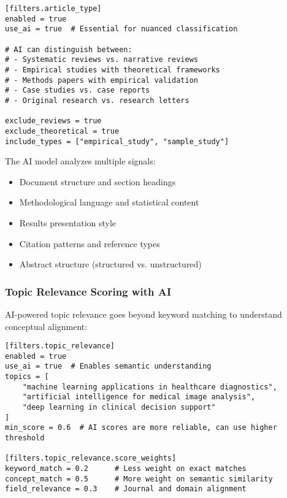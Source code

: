 \begin{configbox}
\begin{lstlisting}
[filters.article_type]
enabled = true
use_ai = true  # Essential for nuanced classification

# AI can distinguish between:
# - Systematic reviews vs. narrative reviews
# - Empirical studies with theoretical frameworks
# - Methods papers with empirical validation
# - Case studies vs. case reports
# - Original research vs. research letters

exclude_reviews = true
exclude_theoretical = true
include_types = ["empirical_study", "sample_study"]
\end{lstlisting}
\end{configbox}

The AI model analyzes multiple signals:
\begin{itemize}
    \item Document structure and section headings
    \item Methodological language and statistical content
    \item Results presentation style
    \item Citation patterns and reference types
    \item Abstract structure (structured vs. unstructured)
\end{itemize}

\subsubsection{Topic Relevance Scoring with AI}

AI-powered topic relevance goes beyond keyword matching to understand conceptual alignment:

\begin{configbox}
\begin{lstlisting}
[filters.topic_relevance]
enabled = true
use_ai = true  # Enables semantic understanding
topics = [
    "machine learning applications in healthcare diagnostics",
    "artificial intelligence for medical image analysis",
    "deep learning in clinical decision support"
]
min_score = 0.6  # AI scores are more reliable, can use higher threshold

[filters.topic_relevance.score_weights]
keyword_match = 0.2      # Less weight on exact matches
concept_match = 0.5      # More weight on semantic similarity
field_relevance = 0.3    # Journal and domain alignment
\end{lstlisting}
\end{configbox}

